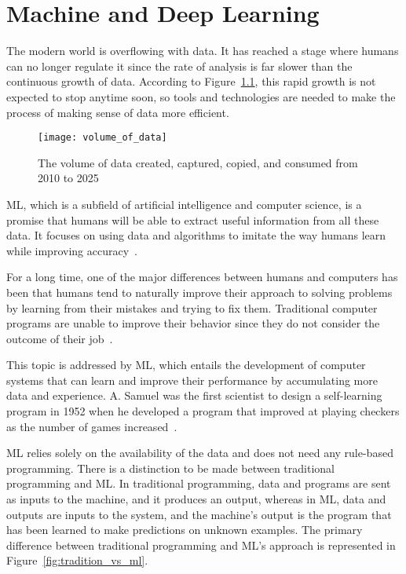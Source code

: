 \chapter{Machine and Deep Learning} \label{sec:ml}

The modern world is overflowing with data. It has reached a stage where humans can no longer regulate it since the rate of analysis is far slower than the continuous growth of data. According to Figure~\ref{fig:volume_of_data}, this rapid growth is not expected to stop anytime soon, so tools and technologies are needed to make the process of making sense of data more efficient.

\begin{figure}[htbp]
    \centering
    \texttt{[image: volume\_of\_data]}
    \caption{The volume of data created, captured, copied, and consumed from 2010 to 2025~\cite{TotalStatista}}
    \label{fig:volume_of_data}
\end{figure}

\gls{ML}, which is a subfield of artificial intelligence and computer science, is a promise that humans will be able to extract useful information from all these data. It focuses on using data and algorithms to imitate the way humans learn while improving accuracy~\cite{IBMCloudEducationWhatLearning}.

For a long time, one of the major differences between humans and computers has been that humans tend to naturally improve their approach to solving problems by learning from their mistakes and trying to fix them. Traditional computer programs are unable to improve their behavior since they do not consider the outcome of their job~\cite{Luckert2016UsingDocuments}. 

This topic is addressed by \gls{ML}, which entails the development of computer systems that can learn and improve their performance by accumulating more data and experience. A. Samuel was the first scientist to design a self-learning program in 1952 when he developed a program that improved at playing checkers as the number of games increased~\cite{Samuel1959SomeCheckers,Luckert2016UsingDocuments}. 

\gls{ML} relies solely on the availability of the data and does not need any rule-based programming. There is a distinction to be made between traditional programming and \gls{ML}. In traditional programming, data and programs are sent as inputs to the machine, and it produces an output, whereas in \gls{ML}, data and outputs are inputs to the system, and the machine's output is the program that has been learned to make predictions on unknown examples. The primary difference between traditional programming and \gls{ML}'s approach is represented in Figure~\ref{fig:tradition_vs_ml}.


